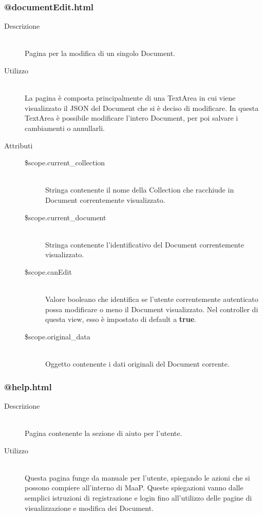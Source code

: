 \subsubsection{@documentEdit.html}
\begin{description}
	\item[Descrizione] \hfill \\
	Pagina per la modifica di un singolo Document.
	\item[Utilizzo] \hfill \\
	La pagina è composta principalmente di una TextArea in cui viene visualizzato il JSON del Document che si è deciso di modificare. In questa TextArea è possibile modificare l'intero Document, per poi salvare i cambiamenti o annullarli.
	\item[Attributi] \hfill
	\begin{description}
		\item[\$scope.current\_collection] \hfill \\
		Stringa contenente il nome della Collection che racchiude in Document correntemente visualizzato.
		\item[\$scope.current\_document] \hfill \\
		Stringa contenente l'identificativo del Document correntemente visualizzato.
		\item[\$scope.canEdit] \hfill \\
		Valore booleano che identifica se l'utente correntemente autenticato possa modificare o meno il Document visualizzato. Nel controller di questa view, esso è impostato di default a \textbf{true}.
		\item[\$scope.original\_data] \hfill \\
		Oggetto contenente i dati originali del Document corrente.
	\end{description}
\end{description}

\subsubsection{@help.html}
\begin{description}
	\item[Descrizione] \hfill \\
	Pagina contenente la sezione di aiuto per l'utente.
	\item[Utilizzo] \hfill \\
 	Questa pagina funge da manuale per l'utente, spiegando le azioni che si possono compiere all'interno di MaaP. Queste spiegazioni vanno dalle semplici istruzioni di registrazione e login fino all'utilizzo delle pagine di visualizzazione e modifica dei Document. 
\end{description}

